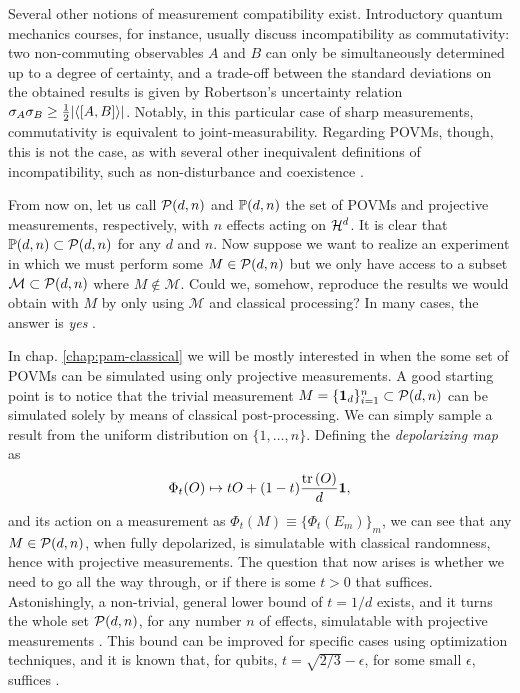 		Several other notions of measurement compatibility exist. Introductory quantum mechanics courses, for instance, usually discuss incompatibility as commutativity: two non-commuting observables $A$ and $B$ can only be simultaneously determined up to a degree of certainty, and a trade-off between the standard deviations on the obtained results is given by Robertson's uncertainty relation $\sigma_A \sigma_B \geq \frac{1}{2} \abs{ \langle \left[ A, B \right] \rangle }$. Notably, in this particular case of sharp measurements, commutativity is equivalent to joint-measurability. Regarding POVMs, though, this is not the case, as with several other inequivalent definitions of incompatibility, such as non-disturbance and coexistence \cite{heinosaari_2016_incompatible}.
		
		From now on, let us call $\mathcal{P}(d,n)$ and $\mathbb{P}(d,n)$ the set of POVMs and projective measurements, respectively, with $n$ effects acting on $\mathcal{H}^{d}$. It is clear that $\mathbb{P}(d,n) \subset \mathcal{P}(d,n)$ for any $d$ and $n$. Now suppose we want to realize an experiment in which we must perform some $M \in \mathcal{P}(d,n)$ but we only have access to a subset $\mathcal{M} \subset \mathcal{P}(d,n)$ where $M \notin \mathcal{M}$. Could we, somehow, reproduce the results we would obtain with $M$ by only using $\mathcal{M}$ and classical processing? In many cases, the answer is \emph{yes} \cite{guerini_tese,guerini_2017_measurementsimulability,haapasalo_2012_measurementsmixing}.
		
		In chap. \ref{chap:pam-classical} we will be mostly interested in when the some set of POVMs can be simulated using only projective measurements. A good starting point is to notice that the trivial measurement $M = \{ \mathbf{1}_d \}_{i=1}^n \subset \mathcal{P}(d,n)$ can be simulated solely by means of classical post-processing. We can simply sample a result from the uniform distribution on $\{ 1, \ldots, n \}$. Defining the \emph{depolarizing map} as 
		\begin{equation}
			\Phi_t(O) \mapsto t O + (1-t) \frac{ \text{tr}\left( O \right) }{d} \mathbf{1} ,
			\label{eq:depolarizing-map}
		\end{equation}
		and its action on a measurement as $\Phi_t (M) \equiv \{ \Phi_t(E_m) \}_m$, we can see that any $M \in \mathcal{P}(d,n)$, when fully depolarized, is simulatable with classical randomness, hence with projective measurements. The question that now arises is whether we need to go all the way through, or if there is some $t > 0$ that suffices. Astonishingly, a non-trivial, general lower bound of $t = 1/d$ exists, and it turns the whole set $\mathcal{P}(d,n)$, for any number $n$ of effects, simulatable with projective measurements \cite{oszmaniec_2017_simulating}. This bound can be improved for specific cases using optimization techniques, and it is known that, for qubits, $t = \sqrt{2/3} - \epsilon$, for some small $\epsilon$, suffices \cite{guerini_tese}.
		

